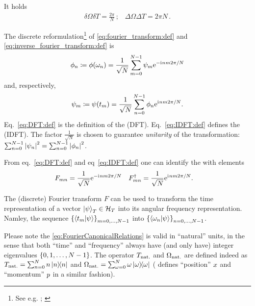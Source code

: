It holds
\begin{gather}
  \delta\Omega \delta T = \frac{2\pi}{N} \, \text{;} \quad
  \Delta\Omega \Delta T = 2\pi N \, \text{.}
\end{gather}

The discrete reformulation\footnote{
  See e.g.
  \cite[Ch. ``The Discrete Fourier Transform'']{Oppenheim:Int1,Oppenheim:Int3};
  \cite[Ch. 5]{ProakisManolakis}
}
of \eqref{eq:fourier_transform:def} and \eqref{eq:inverse_fourier_transform:def}
is
\begin{equation}\label{eq:DFT:def}
  \phi_n \coloneqq \phi(\omega_n) = \frac{1}{\sqrt{N}} \sum_{m=0}^{N-1} \psi_m \mathrm{e}^{-\mathrm{i}\mkern1mu n m 2 \pi / N}
\end{equation}
and, respectively,
\begin{equation}\label{eq:IDFT:def}
  \psi_m \coloneqq \psi(t_m) = \frac{1}{\sqrt{N}} \sum_{n=0}^{N-1} \phi_n \mathrm{e}^{\mathrm{i}\mkern1mu n m 2 \pi / N} \text{.}
\end{equation}
Eq.~\eqref{eq:DFT:def} is the definition of the  (DFT).
Eq.~\eqref{eq:IDFT:def} defines the  (IDFT).
The factor $\frac{1}{\sqrt{N}}$ is chosen to guarantee \emph{unitarity} of the transformation:
$\sum_{n=0}^{N-1} \abs{\psi_n}^2 = \sum_{n=0}^{N-1} \abs{\phi_n}^2$.

From eq.~\eqref{eq:DFT:def} and eq~\eqref{eq:IDFT:def} one can identify the
with elements
\begin{align}
  F_{mn}            &= \frac{1}{\sqrt{N}} \mathrm{e}^{-\mathrm{i}\mkern1mu n m 2 \pi / N}    &
  F_{mn}^{\dagger}  &= \frac{1}{\sqrt{N}} \mathrm{e}^{ \mathrm{i}\mkern1mu n m 2 \pi / N}
  \text{.}
\end{align}

The (discrete) Fourier transform $F$ can be used to transform the time representation
of a vector $\ket{\psi}_T \in \mathcal{H}_T$ into its angular frequency representation.
Namley, the sequence $\left\{\braket{t_m}{\psi}\right\}_{m=0, \dots, N-1}$ into
$\left\{\braket{\omega_n}{\psi}\right\}_{n=0, \dots, N-1}$. 


\noindent{\color{red} \rule{\linewidth}{1pt}}  %

Please note the \eqref{eq:FourierCanonicalRelations} is valid in ``natural'' units,
in the sense that
both ``time'' and ``frequency'' 
always have (and only have) integer eigenvalues $\left\{0, 1, \dots, N-1\right\}$.
The operator ${T}_{\mathrm{nat.}}$ and ${\Omega}_{\mathrm{nat.}}$ are defined indeed as
${T}_{\mathrm{nat.}} = \sum_{n=0}^{N} n \ketbra{n}$ and
${\Omega}_{\mathrm{nat.}} = \sum_{\omega=0}^{N} \omega \ketbra{\omega}$
(\citereset\cite{FiniteHilb} defines ``position'' ${x}$ and ``momentum'' ${p}$ in a similar fashion).

